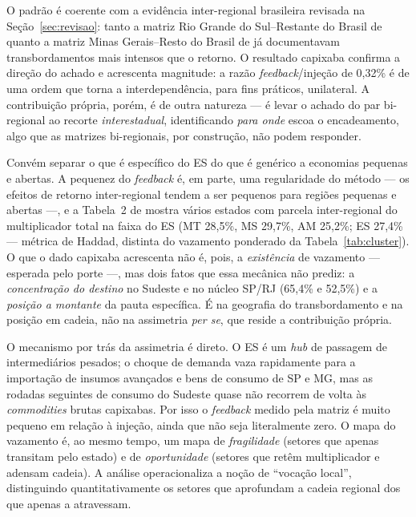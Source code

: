 \documentclass[11pt,a4paper]{article}
\begin{document}
O padrão é coerente com a evidência inter-regional brasileira revisada na
Seção~\ref{sec:revisao}: tanto a matriz Rio Grande do Sul--Restante do Brasil
de \citet{porsse2008matriz} quanto a matriz Minas Gerais--Resto do Brasil de
\citet{domingues2002matriz} já documentavam transbordamentos mais intensos que
o retorno. O resultado capixaba confirma a direção do achado e acrescenta
magnitude: a razão \emph{feedback}/injeção de 0,32\% é de uma ordem que torna
a interdependência, para fins práticos, unilateral. A contribuição própria,
porém, é de outra natureza --- é levar o achado do par bi-regional ao recorte
\emph{interestadual}, identificando \emph{para onde} escoa o encadeamento, algo
que as matrizes bi-regionais, por construção, não podem responder.

Convém separar o que é específico do ES do que é genérico a economias pequenas e
abertas. A pequenez do \emph{feedback} é, em parte, uma regularidade do método --- os
efeitos de retorno inter-regional tendem a ser pequenos para regiões pequenas e abertas
\citep{miller1966} ---, e a Tabela~2 de \citet{haddad2017iioas} mostra vários estados
com parcela inter-regional do multiplicador total na faixa do ES (MT 28,5\%, MS 29,7\%,
AM 25,2\%; ES 27,4\% --- métrica de Haddad, distinta do vazamento ponderado da
Tabela~\ref{tab:cluster}). O que o dado capixaba acrescenta não é, pois, a \emph{existência}
de vazamento --- esperada pelo porte ---, mas dois fatos que essa mecânica não prediz: a
\emph{concentração do destino} no Sudeste e no núcleo SP/RJ (65,4\% e 52,5\%) e a
\emph{posição a montante} da pauta específica. É na geografia do transbordamento e na
posição em cadeia, não na assimetria \emph{per se}, que reside a contribuição própria.

O mecanismo por trás da assimetria é direto. O ES é um \emph{hub} de passagem
de intermediários pesados; o choque de demanda vaza rapidamente para a
importação de insumos avançados e bens de consumo de SP e MG, mas as rodadas
seguintes de consumo do Sudeste quase não recorrem de volta às \emph{commodities}
brutas capixabas. Por isso o \emph{feedback} medido pela matriz é muito
pequeno em relação à injeção, ainda que não seja literalmente zero. O mapa do
vazamento é, ao mesmo tempo, um mapa de \emph{fragilidade} (setores que apenas
transitam pelo estado) e de \emph{oportunidade} (setores que retêm
multiplicador e adensam cadeia). A análise operacionaliza a noção de
``vocação local'', distinguindo quantitativamente os setores que aprofundam a
cadeia regional dos que apenas a atravessam.
\end{document}
